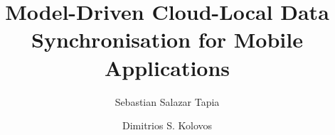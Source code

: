\documentclass[runningheads,a4paper]{llncs}
\begin{document}
\title{Model-Driven Cloud-Local Data \\Synchronisation for Mobile Applications}
\author{Sebastian Salazar Tapia\and Dimitrios S. Kolovos}
\maketitle
\end{document}

